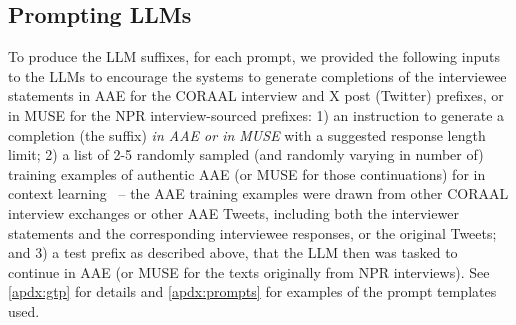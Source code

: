 \subsection{Prompting LLMs}

To produce the LLM suffixes, for each prompt, we provided the following inputs to the LLMs to encourage the systems to generate completions of the interviewee statements in AAE for the CORAAL interview and X post (Twitter) prefixes, or in MUSE for the NPR interview-sourced prefixes: 1) an instruction to generate a completion (the suffix) \textit{in AAE or in MUSE} with a suggested response length limit; 2) a list of 2-5 randomly sampled (and randomly varying in number of) training examples of authentic AAE (or MUSE for those continuations) for in context learning~\cite{brown2020language} -- the AAE training examples were drawn from other CORAAL interview exchanges or other AAE Tweets, including both the interviewer statements and the corresponding interviewee responses, or the original Tweets; and 3) a test prefix as described above, that the LLM then was tasked to continue in AAE (or MUSE for the texts originally from NPR interviews). See \autoref{apdx:gtp} for details and \autoref{apdx:prompts} for examples of the prompt templates used.





